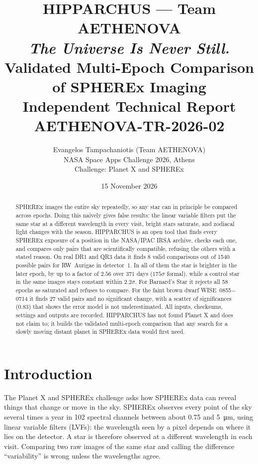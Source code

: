\documentclass[11pt,a4paper]{article}
\title{HIPPARCHUS --- Team AETHENOVA\\[4pt]
\large\emph{The Universe Is Never Still.}\\[8pt]
\normalsize Validated Multi-Epoch Comparison of SPHEREx Imaging\\
\normalsize Independent Technical Report AETHENOVA-TR-2026-02}
\author{Evangelos Tampachaniotis (Team AETHENOVA) \\ NASA Space Apps Challenge 2026, Athens \\ \small Challenge: Planet X and SPHEREx}
\date{15 November 2026}
\begin{document}
\maketitle
\noindent{}

\begin{abstract}
SPHEREx images the entire sky repeatedly, so any star can in principle be compared across epochs. Doing this
naively gives false results: the linear variable filters put the same star at a different wavelength in every
visit, bright stars saturate, and zodiacal light changes with the season. HIPPARCHUS is an open tool that finds
every SPHEREx exposure of a position in the NASA/IPAC IRSA archive, checks each one, and compares only pairs that
are scientifically compatible, refusing the others with a stated reason. On real DR1 and QR3 data it finds
8 valid comparisons out of 1540 possible pairs for RW~Aurigae in detector~1. In all of them the star is brighter in the later
epoch, by up to a factor of $2.56$ over 371 days ($175\sigma$ formal), while a control star in the same images stays
constant within $2.2\sigma$. For Barnard's Star it rejects all 58 epochs as saturated and refuses to compare. For the faint
brown dwarf WISE~0855$-$0714 it finds 27 valid pairs and no significant change, with a scatter of significances
(0.83) that shows the error model is not underestimated. All inputs, checksums, settings and outputs are recorded.
HIPPARCHUS has not found Planet X and does not claim to; it builds the validated multi-epoch comparison that any
search for a slowly moving distant planet in SPHEREx data would first need.
\end{abstract}

\section{Introduction}
The Planet X and SPHEREx challenge asks how SPHEREx data can reveal things that change or move in the sky.
SPHEREx \parencite{dore2014} observes every point of the sky several times a year in 102 spectral channels between
about 0.75 and \SI{5}{\micro\meter}, using linear variable filters (LVFs): the wavelength seen by a pixel depends on
where it lies on the detector. A star is therefore observed at a different wavelength in each visit. Comparing two
raw images of the same star and calling the difference ``variability'' is wrong unless the wavelengths agree.
\end{document}
